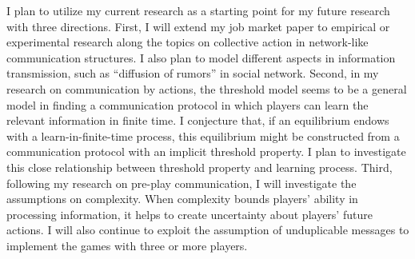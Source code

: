 \documentclass[12pt]{article}
\theoremstyle{definition}
\theoremstyle{remark}
\theoremstyle{claim}
\begin{document}
I plan to utilize my current research as a starting point for my future research with three directions. First, I will extend my job market paper to empirical or experimental research along the topics on collective action in network-like communication structures. I also plan to model different aspects in information transmission, such as “diffusion of rumors” in social network. Second, in my research on communication by actions, the threshold model seems to be a general model in finding a communication protocol in which players can learn the relevant information in finite time. I conjecture that, if an equilibrium endows with a learn-in-finite-time process, this equilibrium might be constructed from a communication protocol with an implicit threshold property. I plan to investigate this close relationship between threshold property and learning process. Third, following my research on pre-play communication, I will investigate the assumptions on complexity. When complexity bounds players' ability in processing information, it helps to create uncertainty about players' future actions. I will also continue to exploit the assumption of unduplicable messages to implement the games with three or more players.  



 





\end{document}
